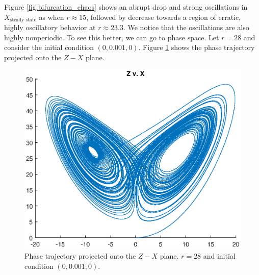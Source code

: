\documentclass[twocolumn,amsmath,amssymb,aps]{revtex4}
\begin{document}
Figure \ref{fig:bifurcation_chaos} shows an abrupt drop and strong oscillations in $X_{\text{steady state}}$ as when $r \approx 15$, followed by decrease towards a region of erratic, highly oscillatory behavior at $r\approx 23.3$. We notice that the oscillations are also highly nonperiodic. To see this better, we can go to phase space. Let $r=28$ and consider the initial condition $(0,0.001,0)$. Figure \ref{fig:lorenz_butterfly_1} shows the phase trajectory projected onto the $Z-X$ plane.  
\begin{figure}[!htb]
	\centering
	\includegraphics[scale=0.5]{ZX_butterfly}
	\caption{Phase trajectory projected onto the $Z-X$ plane. $r=28$ and initial condition $(0,0.001,0)$.}
	\label{fig:lorenz_butterfly_1}
\end{figure}
\end{document}
